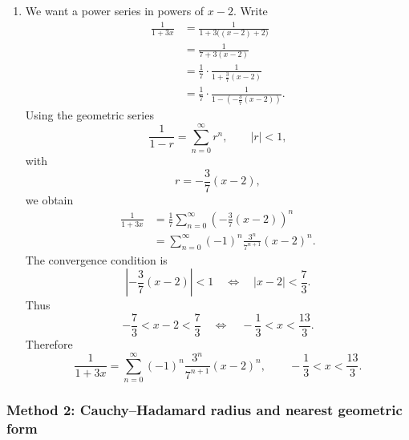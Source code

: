 \documentclass[12pt]{article}
\newcommand{\abs}[1]{\left|#1\right|}
\begin{document}
\begin{enumerate}[label=(\alph*)]
\item We want a power series in powers of $x-2$. Write
\begin{align*}
\frac{1}{1+3x}
&=\frac{1}{1+3\bigl((x-2)+2\bigr)} \\
&=\frac{1}{7+3(x-2)} \\
&=\frac17\cdot \frac{1}{1+\frac37(x-2)} \\
&=\frac17\cdot \frac{1}{1-\left(-\frac37(x-2)\right)}.
\end{align*}
Using the geometric series
\[
\frac{1}{1-r}=\sum_{n=0}^{\infty}r^n,
\qquad \abs{r}<1,
\]
with
\[
r=-\frac37(x-2),
\]
we obtain
\begin{align*}
\frac{1}{1+3x}
&=\frac17\sum_{n=0}^{\infty}\left(-\frac37(x-2)\right)^n \\
&=\sum_{n=0}^{\infty}(-1)^n\frac{3^n}{7^{n+1}}(x-2)^n.
\end{align*}
The convergence condition is
\[
\abs{-\frac37(x-2)}<1
\quad\Longleftrightarrow\quad
\abs{x-2}<\frac73.
\]
Thus
\[
-\frac73<x-2<\frac73
\quad\Longleftrightarrow\quad
-\frac13<x<\frac{13}{3}.
\]
Therefore
\[
\boxed{\displaystyle
\frac{1}{1+3x}=\sum_{n=0}^{\infty}(-1)^n\frac{3^n}{7^{n+1}}(x-2)^n,
\qquad -\frac13<x<\frac{13}{3}.}
\]
\end{enumerate}

\newpage
\subsubsection{Method 2: Cauchy--Hadamard radius and nearest geometric form}
\end{document}
